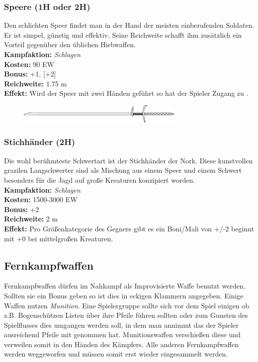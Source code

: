 \subsubsection*{Speere (1H oder 2H)} \label{ar:speere}
Den schlichten Speer findet man in der Hand der meisten einberufenden Soldaten. Er ist simpel, günstig und effektiv. Seine Reichweite schafft ihm zusätzlich ein Vorteil gegenüber den üblichen Hiebwaffen.\\
\textbf{Kampfaktion:} \textit{Schlagen} \\
\textbf{Kosten:} 90 EW\\
\textbf{Bonus:} +1, [+2]\\
\textbf{Reichweite:} 1.75 m\\
\textbf{Effekt:} Wird der Speer mit zwei Händen geführt so hat der Spieler Zugang zu \textit{}.

\begin{figure}[htbp]
		\includegraphics[width=8cm]{Pictures/Sticharm.png}
        \label{fig:Sticharm}
\end{figure}

\subsubsection*{Stichhänder (2H)} \label{ar:stichhaender}
Die wohl berühmteste Schwertart ist der Stichhänder der Nork. Diese kunstvollen grazilen Langschwerter sind als Mischung aus einem Speer und einem Schwert besonders für die Jagd auf große Kreaturen konzipiert worden.\\
\textbf{Kampfaktion:} \textit{Schlagen} \\
\textbf{Kosten:} 1500-3000 EW\\
\textbf{Bonus:} +2\\
\textbf{Reichweite:} 2 m\\
\textbf{Effekt:} Pro Größenkategorie des Gegners gibt es ein Boni/Mali von +/-2 beginnt mit +0 bei mittelgroßen Kreaturen. 


\subsection*{Fernkampfwaffen}
Fernkampfwaffen dürfen im Nahkampf als Improvisierte Waffe benutzt werden. Sollten sie ein Bonus geben so ist dies in eckigen Klammern angegeben. Einige Waffen nutzen \textit{Munition}. Eine Spielergruppe sollte sich vor dem Spiel einigen ob z.B. Bogenschützen Listen über ihre Pfeile führen sollten oder zum Gunsten des Spielflusses dies umgangen werden soll, in dem man annimmt das der Spieler ausreichend Pfeile mit genommen hat. Munitionswaffen verschießen diese und verweilen somit in den Händen des Kämpfers. Alle anderen Fernkampfwaffen werden weggeworfen und müssen somit erst wieder eingesammelt werden.

